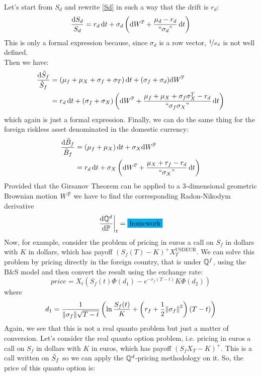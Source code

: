 Let's start from $S_d$ and rewrite \eqref{Sd} in such a way that the drift is $r_d$:
\begin{align}
    \frac{\dd S_d}{S_d} = r_d\,\dd t + \sigma_d\left(\dd W^{\mathbb{P}} + \frac{\mu_d-r_d}{``\sigma_d"}\,\dd t\right)
\end{align}
This is only a formal expression because, since $\sigma_d$ is a row vector, $\nicefrac{1}{\sigma_d}$ is not well defined.\\
Then we have:
\begin{align}
    \notag\frac{\dd\Tilde{S}_f}{\Tilde{S}_f} &= (\mu_f+\mu_X+\sigma_f+\sigma_T)\,\dd t + (\sigma_f + \sigma_d)\dd W^{\mathbb{P}} \\
    &=
    r_d\,\dd t + (\sigma_f+\sigma_X)\left(\dd W^{\mathbb{P}}+\dfrac{\mu_f + \mu_X + \sigma_f\sigma_X^T - r_d}{``\sigma_f\sigma_X"}\,\dd t\right)
\end{align}
which again is just a formal expression. Finally, we can do the same thing for the foreign riskless asset denominated in the domestic currency:
\begin{align}
    \notag\frac{\dd\Tilde{B}_f}{\Tilde{B}_f} &= (\mu_f+\mu_X)\,\dd t + \sigma_X\dd W^{\mathbb{P}} \\
    &=
    r_d\,\dd t + \sigma_X\left(\dd W^{\mathbb{P}}+\dfrac{\mu_X + r_f - r_d}{``\sigma_X"}\,\dd t\right)
\end{align}
Provided that the Girsanov Theorem can be applied to a 3-dimensional geometric Brownian motion $W^{\mathbb{P}}$ we have to find the corresponding Radon-Nikodym derivative
\begin{equation} %
    \eval{\dfrac{\dd\Qmeas^d}{\dd\Pmeas}}_t = \colorbox{cyan}{homework}
\end{equation}
Now, for example, consider the problem of pricing in euros a call on $S_f$ in dollars with $K$ in dollars, which has payoff $(S_f(T)-K)^+X_T^{\text{USDEUR}}$. We can solve this problem by pricing directly in the foreign country, that is under $\mathbb{Q}^f$, using the B\&S model and then convert the result using the exchange rate:
\begin{equation}
    price = X_t(S_f(t)\Phi(d_1)-e^{-r_f(T-t)}K\Phi(d_2))
\end{equation}
where
\begin{equation}
    d_1 = \frac{1}{\norm{\sigma_f}\sqrt{T-t}}\left(\ln\frac{S_f(t)}{K}+\left(r_f+\frac{1}{2}\norm{\sigma_f}^2\right)(T-t)\right)
\end{equation}
Again, we see that this is not a real quanto problem but just a matter of conversion.
Let's consider the real quanto option problem, i.e. pricing in euros a call on $S_f$ in dollars with $K$ in euros, which has payoff $(S_f X_T-K)^+$. This is a call written on $\Tilde{S}_f$ so we can apply the $\mathbb{Q}^d$-pricing methodology on it. So, the price of this quanto option is:

